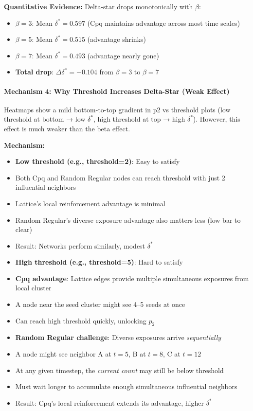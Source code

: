\documentclass[12pt,a4paper]{article}
\begin{document}
\textbf{Quantitative Evidence:} Delta-star drops monotonically with $\beta$:
\begin{itemize}
    \item $\beta=3$: Mean $\delta^* = 0.597$ (Cpq maintains advantage across most time scales)
    \item $\beta=5$: Mean $\delta^* = 0.515$ (advantage shrinks)
    \item $\beta=7$: Mean $\delta^* = 0.493$ (advantage nearly gone)
    \item \textbf{Total drop}: $\Delta \delta^* = -0.104$ from $\beta=3$ to $\beta=7$
\end{itemize}

\paragraph{Mechanism 4: Why Threshold Increases Delta-Star (Weak Effect)}

Heatmaps show a mild bottom-to-top gradient in p2 vs threshold plots (low threshold at bottom → low $\delta^*$, high threshold at top → high $\delta^*$). However, this effect is much weaker than the beta effect.

\textbf{Mechanism:}
\begin{itemize}
    \item \textbf{Low threshold (e.g., threshold=2)}: Easy to satisfy
    \item Both Cpq and Random Regular nodes can reach threshold with just 2 influential neighbors
    \item Lattice's local reinforcement advantage is minimal
    \item Random Regular's diverse exposure advantage also matters less (low bar to clear)
    \item Result: Networks perform similarly, modest $\delta^*$
    \item \textbf{High threshold (e.g., threshold=5)}: Hard to satisfy
    \item \textbf{Cpq advantage}: Lattice edges provide multiple simultaneous exposures from local cluster
    \item A node near the seed cluster might see 4--5 seeds at once
    \item Can reach high threshold quickly, unlocking $p_2$
    \item \textbf{Random Regular challenge}: Diverse exposures arrive \textit{sequentially}
    \item A node might see neighbor A at $t=5$, B at $t=8$, C at $t=12$
    \item At any given timestep, the \textit{current count} may still be below threshold
    \item Must wait longer to accumulate enough simultaneous influential neighbors
    \item Result: Cpq's local reinforcement extends its advantage, higher $\delta^*$
\end{itemize}
\end{document}
